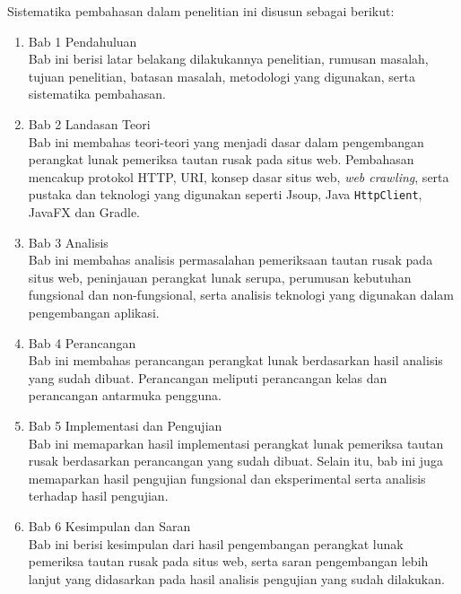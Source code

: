 Sistematika pembahasan dalam penelitian ini disusun sebagai berikut:

\begin{enumerate}
    \item Bab 1 Pendahuluan \\
    Bab ini berisi latar belakang dilakukannya penelitian, rumusan masalah, tujuan penelitian, batasan masalah, metodologi yang digunakan, serta sistematika pembahasan.

    \item Bab 2 Landasan Teori \\
    Bab ini membahas teori-teori yang menjadi dasar dalam pengembangan perangkat lunak pemeriksa tautan rusak pada situs web. Pembahasan mencakup protokol HTTP, URI, konsep dasar situs web, \textit{web crawling}, serta pustaka dan teknologi yang digunakan seperti Jsoup, Java \texttt{HttpClient}, JavaFX dan Gradle.

    \item Bab 3 Analisis \\
    Bab ini membahas analisis permasalahan pemeriksaan tautan rusak pada situs web, peninjauan perangkat lunak serupa, perumusan kebutuhan fungsional dan non-fungsional, serta analisis teknologi yang digunakan dalam pengembangan aplikasi.

    \item Bab 4 Perancangan \\
    Bab ini membahas perancangan perangkat lunak berdasarkan hasil analisis yang sudah dibuat. Perancangan meliputi perancangan kelas dan perancangan antarmuka pengguna.

    \item Bab 5 Implementasi dan Pengujian \\
    Bab ini memaparkan hasil implementasi perangkat lunak pemeriksa tautan rusak berdasarkan perancangan yang sudah dibuat. Selain itu, bab ini juga memaparkan hasil pengujian fungsional dan eksperimental serta analisis terhadap hasil pengujian.
    
    \item Bab 6 Kesimpulan dan Saran \\
    Bab ini berisi kesimpulan dari hasil pengembangan perangkat lunak pemeriksa tautan rusak pada situs web, serta saran pengembangan lebih lanjut yang didasarkan pada hasil analisis pengujian yang sudah dilakukan.
\end{enumerate}